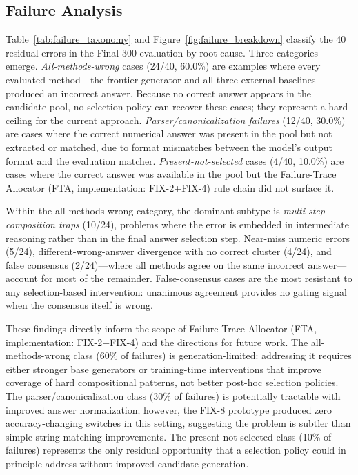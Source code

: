 \subsection{Failure Analysis}
\label{sec:failure_analysis}

Table~\ref{tab:failure_taxonomy} and Figure~\ref{fig:failure_breakdown}
classify the 40 residual errors in the Final-300 evaluation by root cause.
Three categories emerge.
\emph{All-methods-wrong} cases (24/40, 60.0\%) are examples where every evaluated
method---the frontier generator and all three external baselines---produced an
incorrect answer.
Because no correct answer appears in the candidate pool, no selection policy can
recover these cases; they represent a hard ceiling for the current approach.
\emph{Parser/canonicalization failures} (12/40, 30.0\%) are cases where the
correct numerical answer was present in the pool but not extracted or matched, due
to format mismatches between the model's output format and the evaluation matcher.
\emph{Present-not-selected} cases (4/40, 10.0\%) are cases where the correct
answer was available in the pool but the Failure-Trace Allocator (FTA, implementation: FIX-2+FIX-4) rule chain did not surface it.

Within the all-methods-wrong category, the dominant subtype is
\emph{multi-step composition traps} (10/24), problems where the error is embedded
in intermediate reasoning rather than in the final answer selection step.
Near-miss numeric errors (5/24), different-wrong-answer divergence with no correct
cluster (4/24), and false consensus (2/24)---where all methods agree on the same
incorrect answer---account for most of the remainder.
False-consensus cases are the most resistant to any selection-based intervention:
unanimous agreement provides no gating signal when the consensus itself is wrong.

These findings directly inform the scope of Failure-Trace Allocator (FTA, implementation: FIX-2+FIX-4) and the directions for
future work.
The all-methods-wrong class (60\% of failures) is generation-limited: addressing it
requires either stronger base generators or training-time interventions that improve
coverage of hard compositional patterns, not better post-hoc selection policies.
The parser/canonicalization class (30\% of failures) is potentially tractable with
improved answer normalization; however, the FIX-8 prototype produced zero
accuracy-changing switches in this setting, suggesting the problem is subtler than
simple string-matching improvements.
The present-not-selected class (10\% of failures) represents the only residual
opportunity that a selection policy could in principle address without improved
candidate generation.
